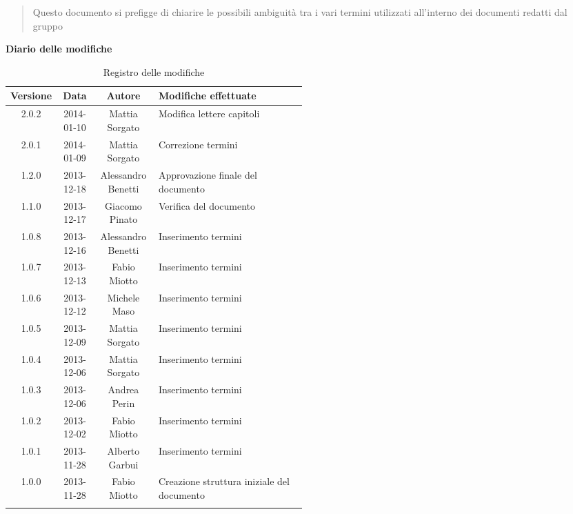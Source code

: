 \begin{abstract}
\begin{center}
Questo documento si prefigge di chiarire le possibili ambiguità tra i vari termini utilizzati all'interno dei documenti redatti dal gruppo \NomeGruppo{}
\end{center}
\end{abstract}

\newpage
\textbf{Diario delle modifiche}
\begin{center}
\begin{longtable}{|c|c|c|p{0.5\linewidth}|}
\toprule
\textbf{Versione} & \textbf{Data} & \textbf{Autore} & \textbf{Modifiche effettuate}\\
\midrule
2.0.2 & 2014-01-10 & Mattia Sorgato & Modifica lettere capitoli\\
\midrule
2.0.1 & 2014-01-09 & Mattia Sorgato & Correzione termini\\
\midrule
1.2.0 & 2013-12-18 & Alessandro Benetti & Approvazione finale del documento\\
\midrule
1.1.0 & 2013-12-17 & Giacomo Pinato & Verifica del documento \\
\midrule
1.0.8 & 2013-12-16 & Alessandro Benetti & Inserimento termini\\
\midrule
1.0.7 & 2013-12-13 & Fabio Miotto & Inserimento termini\\
\midrule
1.0.6 & 2013-12-12 & Michele Maso & Inserimento termini\\
\midrule
1.0.5 & 2013-12-09 & Mattia Sorgato & Inserimento termini\\
\midrule
1.0.4 & 2013-12-06 & Mattia Sorgato & Inserimento termini \\
\midrule
1.0.3 & 2013-12-06 & Andrea Perin & Inserimento termini\\
\midrule
1.0.2 & 2013-12-02 & Fabio Miotto & Inserimento termini\\
\midrule
1.0.1 & 2013-11-28 & Alberto Garbui & Inserimento termini\\
\midrule
1.0.0 & 2013-11-28 & Fabio Miotto & Creazione struttura iniziale del documento\\


\bottomrule
\caption{Registro delle modifiche}
\label{tab:changelog}
\end{longtable}
\end{center}

\newpage
\tableofcontents

